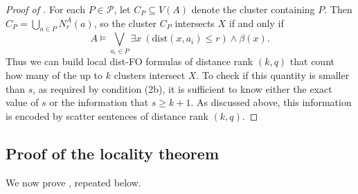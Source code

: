 \documentclass[11pt]{article}
\newcommand{\jan}[1]{\todo[color=green!40]{jan: #1}}
\theoremstyle{remark}
\def\cal{\mathcal}
\renewcommand{\subset}{\subseteq}
\renewcommand{\le}{\leqslant}
\renewcommand{\ge}{\geqslant}
\newcommand{\dist}{\mathrm{dist}}
\newcommand{\distFO}{\textrm{\upshape dist-FO}\xspace}
\begin{document}
\begin{proof}[Proof of ]
    For each $P\in\cal P$,
    let $C_P\subset V(A)$ denote the cluster
    containing $P$.
    Then $C_P=\bigcup_{a\in P}{N_r^A(a)}$, so
    the cluster $C_P$ intersects $X$
    if and only if
    $$A\models \bigvee_{a_i\in P}\exists x~(\dist(x,a_i)\le r)\land \beta(x).$$
    Thus we can build local \distFO formulas of distance rank $(k,q)$ that count how many of the up to \(k\) clusters intersect \(X\).
    To check if this quantity is smaller than \(s\), as required by condition (2b), it is sufficient to know either the exact value of \(s\) or the information that \(s \ge k+1\).
    As discussed above, this information is encoded by scatter sentences of distance rank \((k,q)\).
\end{proof}

\subsection{Proof of the locality theorem}

We now prove , repeated below.
\localglobalgame*
\end{document}
